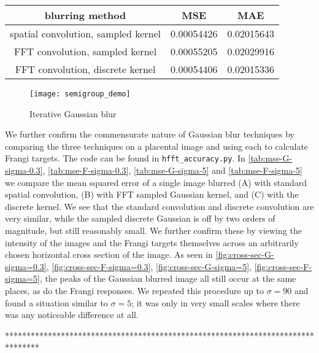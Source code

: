 \begin{table}
  \centering
  \begin{tabular}{c|cc}
   blurring method   & MSE & MAE \\
    \hline
spatial convolution, sampled kernel & 0.00054426 & 0.02015643 \\
FFT convolution, sampled kernel & 0.00055205 & 0.02029916 \\
FFT convolution, discrete kernel & 0.00054406 & 0.02015336
    \end{tabular}
\end{table}


\begin{figure}
  \texttt{[image: semigroup\_demo]}
  \caption{Iterative Gaussian blur}
  \label{fig:semigroup-demo}
\end{figure}

We further confirm the commensurate nature of Gaussian blur techniques by comparing the three techniques on a placental image and using each to calculate Frangi targets. The code can be found in \texttt{hfft\_accuracy.py}. In \cref{tab:mse-G-sigma-0.3}, \cref{tab:mse-F-sigma-0.3}, \cref{tab:mse-G-sigma-5} and \cref{tab:mse-F-sigma-5} we compare the mean squared error of a single image blurred (A) with standard spatial convolution, (B) with FFT sampled Gaussian kernel, and (C) with the discrete kernel. We see that the standard convolution and discrete convolution are very similar, while the sampled discrete Gaussian is off by two orders of magnitude, but still reasonably small. We further confirm these by viewing the intensity of the images and the Frangi targets themselves across an arbitrarily chosen horizontal cross section of the image. As seen in \cref{fig:cross-sec-G-sigma=0.3}, \cref{fig:cross-sec-F-sigma=0.3},
\cref{fig:cross-sec-G-sigma=5}, \cref{fig:cross-sec-F-sigma=5}, the peaks of the Gaussian blurred image all still occur at the same places, as do the Frangi responses. We repeated this procedure up to $\sigma=90$ and found a situation similar to $\sigma=5$; it was only in very small scales where there was any noticeable difference at all.




******************************************************************************** 


